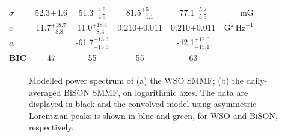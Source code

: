 \begin{table}[ht!]
\begin{center}
\begin{tabular}{l c c | c c r}
			{$\sigma$} & {52.3$\pm 4.6$} & {51.3$_{-4.5}^{+4.6}$} & {81.5$_{-1.1}^{+5.1}$} & {77.1$_{-5.5}^{+5.7}$} & {$\mathrm{mG}$} \\	
			
			{$c$} & {11.7$_{-8.8}^{+18.7}$} & {11.0$_{-8.4}^{+18.4}$} & {0.210$\pm 0.011$} & {0.210$\pm 0.011$} & {$\mathrm{G}^2 \, \mathrm{Hz}^{-1}$} \\	
			
			{$\alpha$} & {--} & {-61.7$_{-15.3}^{+13.3}$} & {--} & {-42.1$_{-15.1}^{+12.0}$} & {--} \\	
			\hline
			{\bf BIC} & {47} & {55} & {55} & {63} & {--} \\	
			\hline
		\end{tabular}
	\end{center}
\end{table}



\begin{figure}[ht!]
	\centering
	\qquad
	\caption{Modelled power spectrum of (a) the WSO SMMF; (b) the daily-averaged BiSON SMMF, on logarithmic axes. The data are displayed in black and the convolved model using asymmetric Lorentzian peaks is shown in blue and green, for WSO and BiSON, respectively.} 
	\label{fig:WSO_and_24h_BiSON_PSD_fit}
\end{figure}

